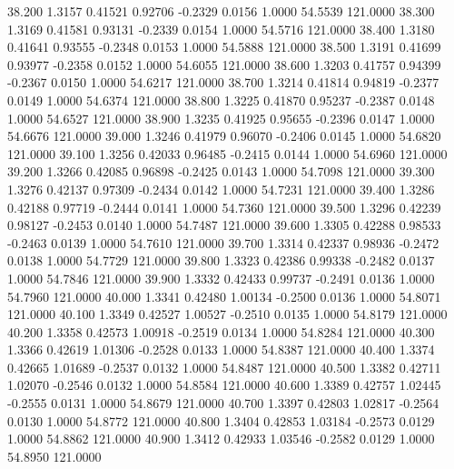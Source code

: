   38.200   1.3157   0.41521   0.92706  -0.2329   0.0156   1.0000  54.5539 121.0000
  38.300   1.3169   0.41581   0.93131  -0.2339   0.0154   1.0000  54.5716 121.0000
  38.400   1.3180   0.41641   0.93555  -0.2348   0.0153   1.0000  54.5888 121.0000
  38.500   1.3191   0.41699   0.93977  -0.2358   0.0152   1.0000  54.6055 121.0000
  38.600   1.3203   0.41757   0.94399  -0.2367   0.0150   1.0000  54.6217 121.0000
  38.700   1.3214   0.41814   0.94819  -0.2377   0.0149   1.0000  54.6374 121.0000
  38.800   1.3225   0.41870   0.95237  -0.2387   0.0148   1.0000  54.6527 121.0000
  38.900   1.3235   0.41925   0.95655  -0.2396   0.0147   1.0000  54.6676 121.0000
  39.000   1.3246   0.41979   0.96070  -0.2406   0.0145   1.0000  54.6820 121.0000
  39.100   1.3256   0.42033   0.96485  -0.2415   0.0144   1.0000  54.6960 121.0000
  39.200   1.3266   0.42085   0.96898  -0.2425   0.0143   1.0000  54.7098 121.0000
  39.300   1.3276   0.42137   0.97309  -0.2434   0.0142   1.0000  54.7231 121.0000
  39.400   1.3286   0.42188   0.97719  -0.2444   0.0141   1.0000  54.7360 121.0000
  39.500   1.3296   0.42239   0.98127  -0.2453   0.0140   1.0000  54.7487 121.0000
  39.600   1.3305   0.42288   0.98533  -0.2463   0.0139   1.0000  54.7610 121.0000
  39.700   1.3314   0.42337   0.98936  -0.2472   0.0138   1.0000  54.7729 121.0000
  39.800   1.3323   0.42386   0.99338  -0.2482   0.0137   1.0000  54.7846 121.0000
  39.900   1.3332   0.42433   0.99737  -0.2491   0.0136   1.0000  54.7960 121.0000
  40.000   1.3341   0.42480   1.00134  -0.2500   0.0136   1.0000  54.8071 121.0000
  40.100   1.3349   0.42527   1.00527  -0.2510   0.0135   1.0000  54.8179 121.0000
  40.200   1.3358   0.42573   1.00918  -0.2519   0.0134   1.0000  54.8284 121.0000
  40.300   1.3366   0.42619   1.01306  -0.2528   0.0133   1.0000  54.8387 121.0000
  40.400   1.3374   0.42665   1.01689  -0.2537   0.0132   1.0000  54.8487 121.0000
  40.500   1.3382   0.42711   1.02070  -0.2546   0.0132   1.0000  54.8584 121.0000
  40.600   1.3389   0.42757   1.02445  -0.2555   0.0131   1.0000  54.8679 121.0000
  40.700   1.3397   0.42803   1.02817  -0.2564   0.0130   1.0000  54.8772 121.0000
  40.800   1.3404   0.42853   1.03184  -0.2573   0.0129   1.0000  54.8862 121.0000
  40.900   1.3412   0.42933   1.03546  -0.2582   0.0129   1.0000  54.8950 121.0000
